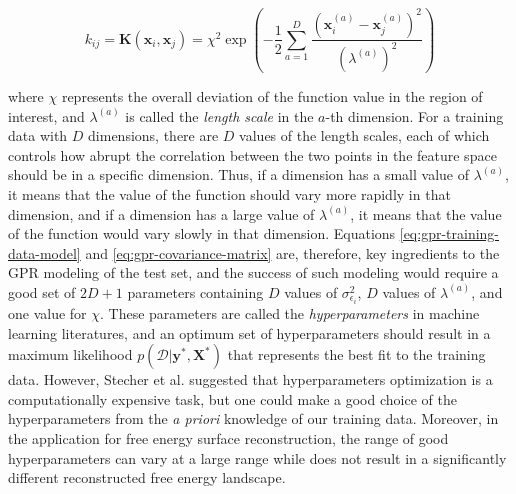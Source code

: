\begin{spacing}{2.0}
    \begin{equation}
        k_{ij} = \mathbf{K}(\mathbf{x}_i,\mathbf{x}_j) = \chi^2\exp\left(-\frac{1}{2}\sum_{a=1}^D\frac{\left(\mathbf{x}_i^{(a)} - 
            \mathbf{x}_j^{(a)}\right)^2}{{(\lambda^{(a)})}^2}\right)
        \label{eq:gpr-covariance-matrix}
    \end{equation}

    \noindent where $\chi$ represents the overall deviation of the function value in the region of interest, and $\lambda^{(a)}$ is called the 
    \textsl{length scale} in the $a$-th dimension. For a training data with $D$ dimensions, there are $D$ values of the length scales, each of 
    which controls how abrupt the correlation between the two points in the feature space should be in a specific dimension. Thus, if a dimension 
    has a small value of $\lambda^{(a)}$, it means that the value of the function should vary more rapidly in that dimension, and if a dimension 
    has a large value of $\lambda^{(a)}$, it means that the value of the function would vary slowly in that dimension. Equations
    \ref{eq:gpr-training-data-model} and \ref{eq:gpr-covariance-matrix} are, therefore, key ingredients to the GPR modeling of the test set, and 
    the success of such modeling would require a good set of $2D+1$ parameters containing $D$ values of $\sigma_{\epsilon_i}^2$, $D$ values
    of $\lambda^{(a)}$, and one value for $\chi$. These parameters are called the \textsl{hyperparameters} in machine learning literatures,
    and an optimum set of hyperparameters should result in a maximum likelihood $p(\mathcal{D}|\mathbf{y}^*,\mathbf{X}^*)$ that represents the best 
    fit to the training data. However, Stecher et al. suggested that hyperparameters optimization is a computationally expensive task, but one could 
    make a good choice of the hyperparameters from the \textsl{a priori} knowledge of our training data. Moreover, in the application for free energy surface 
    reconstruction, the range of good hyperparameters can vary at a large range while does not result in a significantly different reconstructed 
    free energy landscape. \cite{P-JCTC-2014-v10-Stecher}
\end{spacing}
